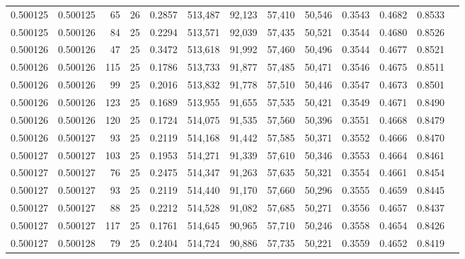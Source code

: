 \begin{tabular}{rrrrrrrrrrrrr}
0.500125 & 0.500125 &    65 &  26 &                                     0.2857 & 513,487 &  92,123 &  57,410 &  50,546 & 0.3543 & 0.4682 & 0.8533 \\
0.500125 & 0.500126 &    84 &  25 &                                     0.2294 & 513,571 &  92,039 &  57,435 &  50,521 & 0.3544 & 0.4680 & 0.8526 \\
0.500126 & 0.500126 &    47 &  25 &                                     0.3472 & 513,618 &  91,992 &  57,460 &  50,496 & 0.3544 & 0.4677 & 0.8521 \\
0.500126 & 0.500126 &   115 &  25 &                                     0.1786 & 513,733 &  91,877 &  57,485 &  50,471 & 0.3546 & 0.4675 & 0.8511 \\
0.500126 & 0.500126 &    99 &  25 &                                     0.2016 & 513,832 &  91,778 &  57,510 &  50,446 & 0.3547 & 0.4673 & 0.8501 \\
0.500126 & 0.500126 &   123 &  25 &                                     0.1689 & 513,955 &  91,655 &  57,535 &  50,421 & 0.3549 & 0.4671 & 0.8490 \\
0.500126 & 0.500126 &   120 &  25 &                                     0.1724 & 514,075 &  91,535 &  57,560 &  50,396 & 0.3551 & 0.4668 & 0.8479 \\
0.500126 & 0.500127 &    93 &  25 &                                     0.2119 & 514,168 &  91,442 &  57,585 &  50,371 & 0.3552 & 0.4666 & 0.8470 \\
0.500127 & 0.500127 &   103 &  25 &                                     0.1953 & 514,271 &  91,339 &  57,610 &  50,346 & 0.3553 & 0.4664 & 0.8461 \\
0.500127 & 0.500127 &    76 &  25 &                                     0.2475 & 514,347 &  91,263 &  57,635 &  50,321 & 0.3554 & 0.4661 & 0.8454 \\
0.500127 & 0.500127 &    93 &  25 &                                     0.2119 & 514,440 &  91,170 &  57,660 &  50,296 & 0.3555 & 0.4659 & 0.8445 \\
0.500127 & 0.500127 &    88 &  25 &                                     0.2212 & 514,528 &  91,082 &  57,685 &  50,271 & 0.3556 & 0.4657 & 0.8437 \\
0.500127 & 0.500127 &   117 &  25 &                                     0.1761 & 514,645 &  90,965 &  57,710 &  50,246 & 0.3558 & 0.4654 & 0.8426 \\
0.500127 & 0.500128 &    79 &  25 &                                     0.2404 & 514,724 &  90,886 &  57,735 &  50,221 & 0.3559 & 0.4652 & 0.8419 \\

\end{tabular}

